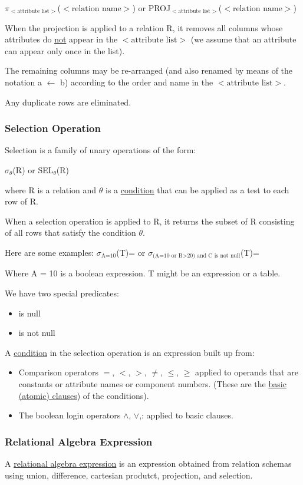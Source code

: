 \begin{center}
    $\pi_{<\mbox{attribute list}>}$($<\mbox{relation name}>$) or
    PROJ$_{<\mbox{attribute list}>}$($<\mbox{relation name}>$)
\end{center}

When the projection is applied to a relation R, it removes all columns whose attributes do \underline{not} appear in the $<\mbox{attribute list}>$ (we assume that an attribute can appear only once in the list).

The remaining columns may be re-arranged (and also renamed by means of the notation a $\leftarrow$ b) according to the order and name in the $<\mbox{attribute list}>$.

Any duplicate rows are eliminated.

\subsubsection{Selection Operation}
Selection is a family of unary operations of the form:

\begin{center}
    $\sigma_\theta$(R) or
    SEL$_\theta$(R)
\end{center}

where R is a relation and $\theta$ is a \underline{condition} that can be applied as a test to each row of R.

When a selection operation is applied to R, it returns the subset of R consisting of all rows that satisfy the condition $\theta$.

Here are some examples:
$\sigma_{\mbox{A=10}}$(T)= or $\sigma_{\mbox{(A=10 or B} > \mbox{20) and C is not null}}$(T)=

Where A = 10 is a boolean expression. T might be an expression or a table.

\vspace{1.5em}
We have two special predicates:
\begin{itemize}
    \item is null
    \item is not null
\end{itemize}

\vspace{1.5em}
A \underline{condition} in the selection operation is an expression built up from: 
\begin{itemize}
    \item Comparison operators $=$, $<$, $>$, $\neq$, $\leq$, $\geq$ applied to operands that are constants or attribute names or component numbers. (These are the \underline{basic (atomic) clauses}) of the conditions).
    \item The boolean login operators $\wedge$, $\vee$,: applied to basic clauses.
\end{itemize}

\subsubsection{Relational Algebra Expression}
A \underline{relational algebra expression} is an expression obtained from relation schemas using union, difference, cartesian produtct, projection, and selection.
